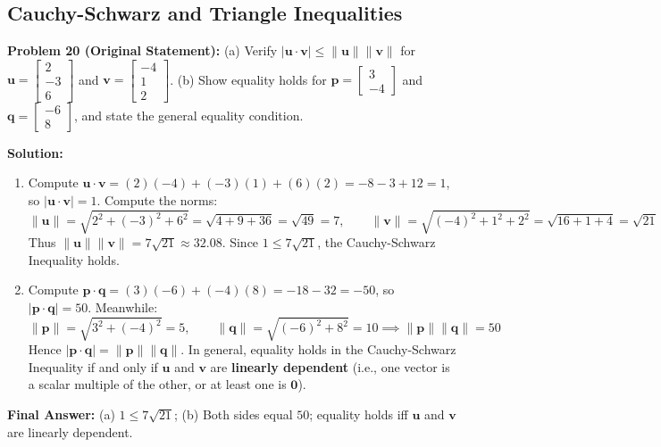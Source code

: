 \documentclass[11pt, letterpaper]{article}
\theoremstyle{definition}
\theoremstyle{remark}
\begin{document}
\subsection{Cauchy-Schwarz and Triangle Inequalities}

\textbf{Problem 20 (Original Statement):} (a) Verify $|\mathbf{u} \cdot \mathbf{v}| \le \|\mathbf{u}\|\|\mathbf{v}\|$ for $\mathbf{u} = \begin{bmatrix} 2 \\ -3 \\ 6 \end{bmatrix}$ and $\mathbf{v} = \begin{bmatrix} -4 \\ 1 \\ 2 \end{bmatrix}$. (b) Show equality holds for $\mathbf{p} = \begin{bmatrix} 3 \\ -4 \end{bmatrix}$ and $\mathbf{q} = \begin{bmatrix} -6 \\ 8 \end{bmatrix}$, and state the general equality condition.

\textbf{Solution:}
\begin{enumerate}[label=(\alph*)]
    \item Compute $\mathbf{u} \cdot \mathbf{v} = (2)(-4) + (-3)(1) + (6)(2) = -8 - 3 + 12 = 1$, so $|\mathbf{u} \cdot \mathbf{v}| = 1$. Compute the norms:
    \[
    \|\mathbf{u}\| = \sqrt{2^2 + (-3)^2 + 6^2} = \sqrt{4 + 9 + 36} = \sqrt{49} = 7, \qquad \|\mathbf{v}\| = \sqrt{(-4)^2 + 1^2 + 2^2} = \sqrt{16 + 1 + 4} = \sqrt{21}
    \]
    Thus $\|\mathbf{u}\|\|\mathbf{v}\| = 7\sqrt{21} \approx 32.08$. Since $1 \le 7\sqrt{21}$, the Cauchy-Schwarz Inequality holds.
    \item Compute $\mathbf{p} \cdot \mathbf{q} = (3)(-6) + (-4)(8) = -18 - 32 = -50$, so $|\mathbf{p} \cdot \mathbf{q}| = 50$. Meanwhile:
    \[
    \|\mathbf{p}\| = \sqrt{3^2 + (-4)^2} = 5, \qquad \|\mathbf{q}\| = \sqrt{(-6)^2 + 8^2} = 10 \implies \|\mathbf{p}\|\|\mathbf{q}\| = 50
    \]
    Hence $|\mathbf{p} \cdot \mathbf{q}| = \|\mathbf{p}\|\|\mathbf{q}\|$. In general, equality holds in the Cauchy-Schwarz Inequality if and only if $\mathbf{u}$ and $\mathbf{v}$ are \textbf{linearly dependent} (i.e., one vector is a scalar multiple of the other, or at least one is $\mathbf{0}$).
\end{enumerate}
\textbf{Final Answer:} (a) $1 \le 7\sqrt{21}$; (b) Both sides equal $50$; equality holds iff $\mathbf{u}$ and $\mathbf{v}$ are linearly dependent.
\end{document}
